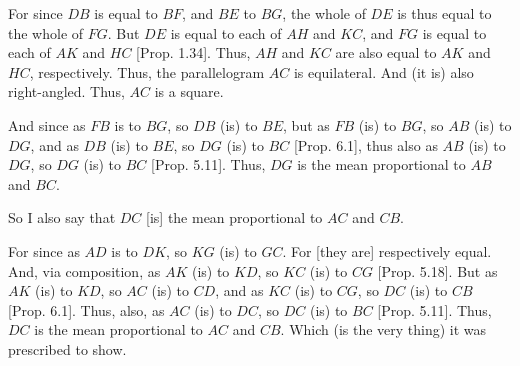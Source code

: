 \begin{Parallel}{}{}
{\epsfysize=1.7in
\centerline{}

For since $DB$ is equal to $BF$, and $BE$ to $BG$, the whole of $DE$
is thus equal to the whole of $FG$. But $DE$ is equal to each of $AH$
and $KC$, and $FG$ is equal to each of $AK$ and $HC$ [Prop. 1.34]. Thus, $AH$ and $KC$ are also 
equal to  $AK$ and $HC$, respectively. Thus, the parallelogram $AC$
is equilateral. And (it is) also right-angled. Thus, $AC$ is a square.

And since as $FB$ is to $BG$, so $DB$ (is) to $BE$, but as $FB$
(is) to $BG$, so $AB$ (is) to $DG$, and as $DB$ (is) to $BE$, so
$DG$ (is) to $BC$ [Prop. 6.1], thus also as $AB$ (is) to $DG$, so $DG$  (is) to $BC$ [Prop. 5.11]. Thus, $DG$ is the mean proportional
to $AB$ and $BC$.

So I also say that $DC$ [is] the mean proportional to $AC$ and $CB$.

For since as $AD$ is to $DK$, so $KG$ (is) to $GC$. For [they are]  respectively equal. And, via composition, as $AK$ (is) to $KD$, so
$KC$ (is) to $CG$ [Prop. 5.18]. But as
$AK$ (is) to $KD$, so $AC$ (is) to $CD$, and as $KC$ (is) to $CG$,
so $DC$ (is) to $CB$ [Prop. 6.1]. Thus, also, as $AC$ (is) to $DC$, so
$DC$ (is) to $BC$ [Prop. 5.11]. Thus, $DC$ is the mean proportional to $AC$ and
$CB$. Which (is the very thing) it was prescribed to show.}
\end{Parallel}

